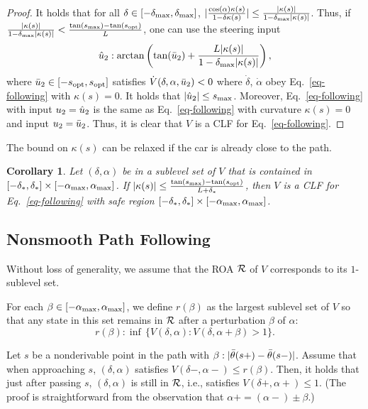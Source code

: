 \documentclass{article}
\theoremstyle{plain}
\newtheorem{corollary}{Corollary}
\theoremstyle{definition}
\theoremstyle{remark}
\newcommand{\smax}{s_\maxtxt}
\newcommand{\sopt}{s_{\mathrm{opt}}}
\newcommand{\deltamax}{\delta_\maxtxt}
\newcommand{\alphamax}{\alpha_\maxtxt}
\begin{document}
\begin{proof}
It holds that for all $\delta\in[-\deltamax,\deltamax]$,
$\lvert\frac{\cos(\alpha)\kappa(s)}{1-\delta\kappa(s)}\rvert\leq
\frac{\lvert\kappa(s)\rvert}{1-\deltamax\lvert\kappa(s)\rvert}$.
Thus, if $\frac{\lvert\kappa(s)\rvert}{1-\deltamax\lvert\kappa(s)\rvert}<\frac{\tan(\smax)-\tan(\sopt)}L$,
one can use the steering input
\[
\uhat_2:\arctan\left(\tan(\ubar_2)+\frac{L\lvert\kappa(s)\rvert}{1-\deltamax\lvert\kappa(s)\rvert}\right),
\]
where $\ubar_2\in[-\sopt,\sopt]$ satisfies $\dot{V}(\delta,\alpha,\bar{u}_2)<0$
where $\dot\delta$, $\dot\alpha$ obey Eq.~\eqref{eq-following} with $\kappa(s)=0$.
It holds that $\lvert\uhat_2\rvert\leq\smax$.
Moreover, Eq.~\eqref{eq-following} with input $u_2=\hat{u}_2$
is the same as Eq.~\eqref{eq-following} with curvature $\kappa(s)=0$ and input $u_2=\bar{u}_2$.
Thus, it is clear that $V$ is a CLF for Eq.~\eqref{eq-following}.
\end{proof}

The bound on $\kappa(s)$ can be relaxed if the car is already close to the path.

\begin{corollary}\label{cor-stright-curved}
Let $(\delta,\alpha)$ be in a sublevel set of $V$ that is contained in
$[-\delta_*,\delta_*]\times[-\alphamax,\alphamax]$.
If $\lvert\kappa(s)\rvert\leq \frac{\tan(\smax)-\tan(\sopt)}{L+\delta_*}$,
then $V$ is a CLF for Eq.~\eqref{eq-following} with safe region $[-\delta_*,\delta_*]\times[-\alphamax,\alphamax]$.
\end{corollary}

\subsection{Nonsmooth Path Following}

Without loss of generality, we assume that the ROA $\mathcal{R}$
of $V$ corresponds to its $1$-sublevel set.

For each $\beta\in[-\alphamax,\alphamax]$, we define $r(\beta)$ as the largest sublevel set of $V$
so that any state in this set remains in $\mathcal{R}$ after a perturbation $\beta$ of $\alpha$:
\[
r(\beta) : \inf\,\{V(\delta,\alpha):V(\delta,\alpha+\beta)>1\}.
\]

Let $s$ be a nonderivable point in the path with $\beta:\lvert\bar{\theta}(s+)-\bar{\theta}(s-)\rvert$.
Assume that when approaching $s$, $(\delta,\alpha)$ satisfies $V(\delta-,\alpha-)\leq r(\beta)$.
Then, it holds that just after passing $s$,
$(\delta,\alpha)$ is still in $\mathcal{R}$, i.e., satisfies $V(\delta+,\alpha+)\leq1$.
(The proof is straightforward from the observation that $\alpha+=(\alpha-)\pm\beta$.)
\end{document}
